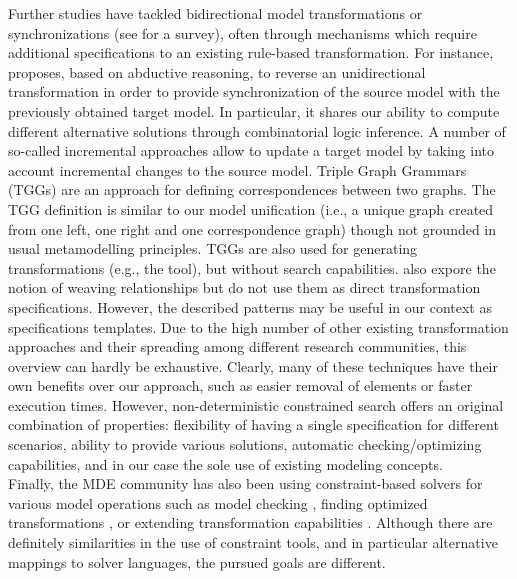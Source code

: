 \documentclass{llncs}
\begin{document}
Further studies have tackled bidirectional model transformations or synchronizations (see \cite{DBLP:conf/icmt/CzarneckiFHLST09} for a survey), often through mechanisms which require additional specifications to an existing rule-based transformation. For instance, \cite{DBLP:conf/icmt/HettelLR09} proposes, based on abductive reasoning, to reverse an unidirectional transformation in order to provide synchronization of the source model with the previously obtained target model. In particular, it shares our ability to compute different alternative solutions through combinatorial logic inference. A number of so-called incremental approaches \cite{DBLP:conf/models/HearndenLR06,DBLP:conf/models/VogelNHGB09,Bergmann:2008:IPM:1402947.1402953} allow to update a target model by taking into account incremental changes to the source model. Triple Graph Grammars (TGGs) \cite{tgg} are an approach for defining correspondences between two graphs. The TGG definition is similar to our model unification (i.e., a unique graph created from one left, one right and one correspondence graph) though not grounded in usual metamodelling principles. TGGs are also used for generating transformations (e.g., the \cite{fujaba} tool), but without search capabilities. \cite{DBLP:journals/sosym/AkehurstKP03,didonetphd} also expore the notion of weaving relationships but do not use them as direct transformation specifications. However, the described patterns may be useful in our context as specifications templates. Due to the high number of other existing transformation approaches and their spreading among different research communities, this overview can hardly be exhaustive. Clearly, many of these techniques have their own benefits over our approach, such as easier removal of elements or faster execution times. However, non-deterministic constrained search offers an original combination of properties: flexibility of having a single specification for different scenarios, ability to provide various solutions, automatic checking/optimizing capabilities, and in our case the sole use of existing modeling concepts.\\
%
Finally, the MDE community has also been using constraint-based solvers for various model operations
such as model checking \cite{DBLP:journals/scp/GogollaBR07,DBLP:conf/kbse/CabotCR07,DBLP:conf/splc/White1},
finding optimized transformations \cite{DBLP:conf/models/KessentiniSB08}, or extending transformation capabilities \cite{DBLP:conf/icmt/PetterBM09}. Although there are definitely similarities in the use of constraint tools, and in particular alternative mappings to solver languages, the pursued goals are different.
%
\end{document}
